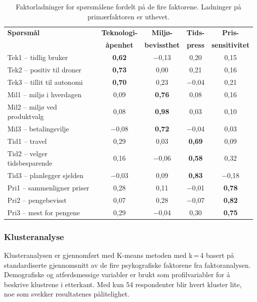 \begin{table}[H]
\centering
\caption[]{Faktorladninger for spørsmålene fordelt på de
fire faktorene. Ladninger på primærfaktoren er uthevet.}
\label{tab:faktorladninger}
\begingroup
\renewcommand{\arraystretch}{1.2}
\small
\begin{tabular}{@{} l c c c c @{}}
\toprule
\textbf{Spørsmål} & \textbf{Teknologi-} & \textbf{Miljø-} & \textbf{Tids-} & \textbf{Pris-} \\
              & \textbf{åpenhet}    & \textbf{bevissthet} & \textbf{press} & \textbf{sensitivitet} \\
\midrule
Tek1 -- tidlig bruker         & \textbf{0,62}  & $-$0,13 & 0,20    & 0,15  \\
Tek2 -- positiv til droner    & \textbf{0,73}  & 0,00    & 0,21    & 0,16  \\
Tek3 -- tillit til autonomi   & \textbf{0,70}  & 0,23    & $-$0,04 & 0,21  \\
Mil1 -- miljø i hverdagen     & 0,09    & \textbf{0,76}  & 0,08    & 0,16  \\
Mil2 -- miljø ved produktvalg & 0,08    & \textbf{0,98}  & 0,03    & 0,10  \\
Mil3 -- betalingsvilje        & $-$0,08 & \textbf{0,72}  & $-$0,04 & 0,03  \\
Tid1 -- travel                & 0,29    & 0,03    & \textbf{0,69}  & 0,09  \\
Tid2 -- velger tidsbesparende & 0,16    & $-$0,06 & \textbf{0,58}  & 0,32  \\
Tid3 -- planlegger sjelden    & $-$0,03 & 0,09    & \textbf{0,83}  & $-$0,18 \\
Pri1 -- sammenligner priser   & 0,28    & 0,11    & $-$0,01 & \textbf{0,78}  \\
Pri2 -- pengebevisst          & 0,07    & 0,28    & $-$0,07 & \textbf{0,82}  \\
Pri3 -- mest for pengene      & 0,29    & $-$0,04 & 0,30    & \textbf{0,75}  \\
\bottomrule
\end{tabular}
\endgroup
\end{table}

\subsubsection*{Klusteranalyse}

Klusteranalysen er gjennomført med K-means metoden med k\,=\,4 basert
på standardiserte gjennomsnitt av de fire psykografiske
faktorene fra faktoranalysen. Demografiske og atferdsmessige variabler er
brukt som profilvariabler for å
beskrive klustrene i etterkant. Med kun 54 respondenter blir hvert kluster
lite, noe som svekker resultatenes pålitelighet.

